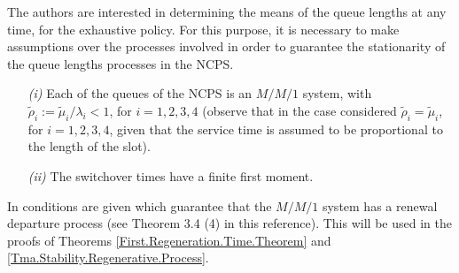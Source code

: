 The authors are interested in determining the means of the queue lengths at any time, for the exhaustive policy. For this purpose, it is necessary to make assumptions over the processes involved in order to guarantee the stationarity of the queue lengths processes in the NCPS. 
\begin{Sup}\label{Supuestos.Estabilidad}\medskip
\begin{itemize}
\item[\textit{(i)} ] Each of the queues of the NCPS is an $M/M/1$ system, with  $\tilde{\rho}_{i}:=\tilde{\mu}_{i}/\lambda_{i}<1$, for $i=1,2,3,4$ (observe that in the case considered $\tilde{\rho}_{i}=\tilde{\mu}_{i}$, for $i=1,2,3,4$, given that the service time is assumed to be proportional to the length of the slot).
\item[\textit{(ii)} ]  The switchover times have a finite first moment.
\end{itemize}
\end{Sup}
\begin{Remark}\label{Observacion.1}
In \cite{Disney} conditions are given which guarantee that the $M/M/1$ system has a renewal departure process (see Theorem 3.4 (4) in this reference). This will be used in the proofs of Theorems \ref{First.Regeneration.Time.Theorem} and \ref{Tma.Stability.Regenerative.Process}.
\end{Remark}

